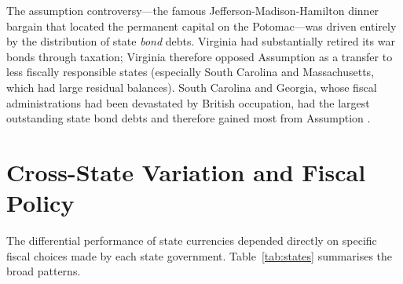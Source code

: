 \documentclass[12pt]{article}
\begin{document}
The assumption controversy---the famous Jefferson-Madison-Hamilton dinner
bargain that located the permanent capital on the Potomac---was driven
entirely by the distribution of state \emph{bond} debts.  Virginia had
substantially retired its war bonds through taxation; Virginia therefore
opposed Assumption as a transfer to less fiscally responsible states
(especially South Carolina and Massachusetts, which had large residual
balances).  South Carolina and Georgia, whose fiscal administrations had
been devastated by British occupation, had the largest outstanding state
bond debts and therefore gained most from Assumption \citep{Ferguson1961,
MatsonOnuf1990, Edling2014}.

\section{Cross-State Variation and Fiscal Policy}

The differential performance of state currencies depended directly on specific
fiscal choices made by each state government.  Table~\ref{tab:states} summarises
the broad patterns.
\end{document}
